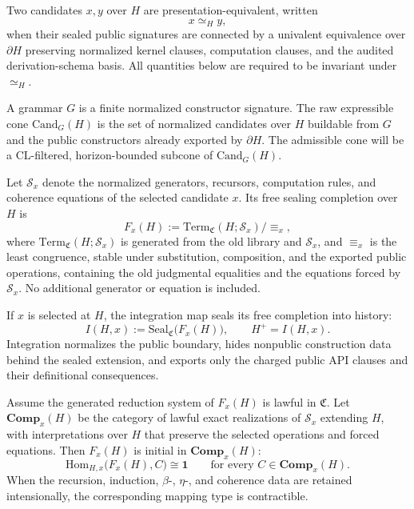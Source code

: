 \begin{definition}
Two candidates \(x,y\) over \(H\) are presentation-equivalent, written
\[
x \simeq_H y,
\]
when their sealed public signatures are connected by a univalent equivalence
over \(\partial H\) preserving normalized kernel clauses, computation clauses,
and the audited derivation-schema basis. All quantities below are required to be
invariant under \(\simeq_H\).
\end{definition}

\begin{definition}
A grammar \(G\) is a finite normalized constructor signature. The raw
expressible cone \(\mathrm{Cand}_G(H)\) is the set of normalized candidates over
\(H\) buildable from \(G\) and the public constructors already exported by
\(\partial H\). The admissible cone will be a CL-filtered, horizon-bounded
subcone of \(\mathrm{Cand}_G(H)\).
\end{definition}

\begin{definition}
Let \(\mathcal{S}_x\) denote the normalized generators, recursors, computation
rules, and coherence equations of the selected candidate \(x\). Its free
sealing completion over \(H\) is
\[
F_x(H)
:=
\mathrm{Term}_{\mathfrak C}(H;\mathcal{S}_x)/{\equiv_x},
\]
where \(\mathrm{Term}_{\mathfrak C}(H;\mathcal{S}_x)\) is generated from the
old library and \(\mathcal{S}_x\), and \(\equiv_x\) is the least congruence,
stable under substitution, composition, and the exported public operations,
containing the old judgmental equalities and the equations forced by
\(\mathcal{S}_x\). No additional generator or equation is included.
\end{definition}

\begin{definition}[Integration]
If \(x\) is selected at \(H\), the integration map seals its free completion
into history:
\[
I(H,x) := \mathrm{Seal}_{\mathfrak{C}}\bigl(F_x(H)\bigr),
\qquad
H^+ = I(H,x).
\]
Integration normalizes the public boundary, hides nonpublic construction data
behind the sealed extension, and exports only the charged public API clauses
and their definitional consequences.
\end{definition}

\begin{theorem}
\label{thm:relative-free-sealing}
Assume the generated reduction system of \(F_x(H)\) is lawful in
\(\mathfrak C\). Let \(\mathbf{Comp}_x(H)\) be the category of lawful exact
realizations of \(\mathcal{S}_x\) extending \(H\), with interpretations over
\(H\) that preserve the selected operations and forced equations. Then
\(F_x(H)\) is initial in \(\mathbf{Comp}_x(H)\):
\[
\mathrm{Hom}_{H,x}\bigl(F_x(H),C\bigr)\cong\mathbf 1
\qquad
\text{for every }C\in\mathbf{Comp}_x(H).
\]
When the recursion, induction, \(\beta\)-, \(\eta\)-, and coherence data are
retained intensionally, the corresponding mapping type is contractible.
\end{theorem}

